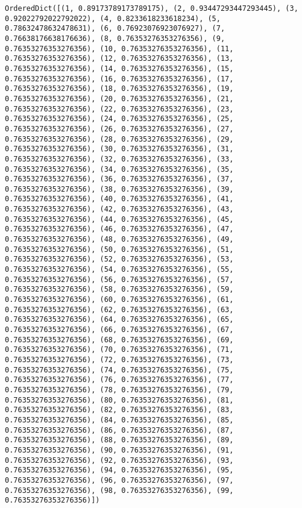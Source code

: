 \documentclass[11pt]{article}
\begin{document}
\begin{Verbatim}[commandchars=\\\{\}]
OrderedDict([(1, 0.89173789173789175), (2, 0.93447293447293445), (3, 0.92022792022792022), (4, 0.8233618233618234), (5, 0.78632478632478631), (6, 0.76923076923076927), (7, 0.76638176638176636), (8, 0.76353276353276356), (9, 0.76353276353276356), (10, 0.76353276353276356), (11, 0.76353276353276356), (12, 0.76353276353276356), (13, 0.76353276353276356), (14, 0.76353276353276356), (15, 0.76353276353276356), (16, 0.76353276353276356), (17, 0.76353276353276356), (18, 0.76353276353276356), (19, 0.76353276353276356), (20, 0.76353276353276356), (21, 0.76353276353276356), (22, 0.76353276353276356), (23, 0.76353276353276356), (24, 0.76353276353276356), (25, 0.76353276353276356), (26, 0.76353276353276356), (27, 0.76353276353276356), (28, 0.76353276353276356), (29, 0.76353276353276356), (30, 0.76353276353276356), (31, 0.76353276353276356), (32, 0.76353276353276356), (33, 0.76353276353276356), (34, 0.76353276353276356), (35, 0.76353276353276356), (36, 0.76353276353276356), (37, 0.76353276353276356), (38, 0.76353276353276356), (39, 0.76353276353276356), (40, 0.76353276353276356), (41, 0.76353276353276356), (42, 0.76353276353276356), (43, 0.76353276353276356), (44, 0.76353276353276356), (45, 0.76353276353276356), (46, 0.76353276353276356), (47, 0.76353276353276356), (48, 0.76353276353276356), (49, 0.76353276353276356), (50, 0.76353276353276356), (51, 0.76353276353276356), (52, 0.76353276353276356), (53, 0.76353276353276356), (54, 0.76353276353276356), (55, 0.76353276353276356), (56, 0.76353276353276356), (57, 0.76353276353276356), (58, 0.76353276353276356), (59, 0.76353276353276356), (60, 0.76353276353276356), (61, 0.76353276353276356), (62, 0.76353276353276356), (63, 0.76353276353276356), (64, 0.76353276353276356), (65, 0.76353276353276356), (66, 0.76353276353276356), (67, 0.76353276353276356), (68, 0.76353276353276356), (69, 0.76353276353276356), (70, 0.76353276353276356), (71, 0.76353276353276356), (72, 0.76353276353276356), (73, 0.76353276353276356), (74, 0.76353276353276356), (75, 0.76353276353276356), (76, 0.76353276353276356), (77, 0.76353276353276356), (78, 0.76353276353276356), (79, 0.76353276353276356), (80, 0.76353276353276356), (81, 0.76353276353276356), (82, 0.76353276353276356), (83, 0.76353276353276356), (84, 0.76353276353276356), (85, 0.76353276353276356), (86, 0.76353276353276356), (87, 0.76353276353276356), (88, 0.76353276353276356), (89, 0.76353276353276356), (90, 0.76353276353276356), (91, 0.76353276353276356), (92, 0.76353276353276356), (93, 0.76353276353276356), (94, 0.76353276353276356), (95, 0.76353276353276356), (96, 0.76353276353276356), (97, 0.76353276353276356), (98, 0.76353276353276356), (99, 0.76353276353276356)])

\end{Verbatim}
\end{document}
